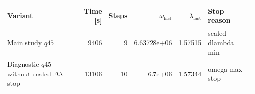 \begin{tabularx}{\textwidth}{@{}XrrrrX@{}}
\toprule
Variant & Time [s] & Steps & $\omega_{\mathrm{last}}$ & $\lambda_{\mathrm{last}}$ & Stop reason \\
\midrule
Main study $q45$ & 9406 & 9 & 6.63728e+06 & 1.57515 & scaled dlambda min \\
Diagnostic $q45$ without scaled $\Delta\lambda$ stop & 13106 & 10 & 6.7e+06 & 1.57344 & omega max stop \\
\bottomrule
\end{tabularx}
